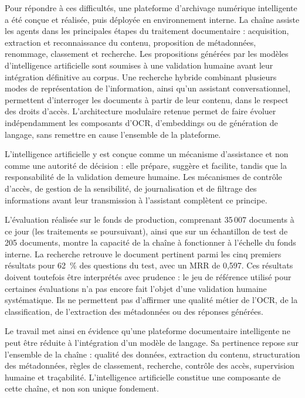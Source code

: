 \documentclass[12pt,a4paper]{report}
\begin{document}
Pour répondre à ces difficultés, une plateforme d'archivage numérique intelligente a été conçue et réalisée, puis déployée en environnement interne. La chaîne assiste les agents dans les principales étapes du traitement documentaire : acquisition, extraction et reconnaissance du contenu, proposition de métadonnées, renommage, classement et recherche. Les propositions générées par les modèles d'intelligence artificielle sont soumises à une validation humaine avant leur intégration définitive au corpus. Une recherche hybride combinant plusieurs modes de représentation de l'information, ainsi qu'un assistant conversationnel, permettent d'interroger les documents à partir de leur contenu, dans le respect des droits d'accès. L'architecture modulaire retenue permet de faire évoluer indépendamment les composants d'OCR, d'embeddings ou de génération de langage, sans remettre en cause l'ensemble de la plateforme.

L'intelligence artificielle y est conçue comme un mécanisme d'assistance et non comme une autorité de décision : elle prépare, suggère et facilite, tandis que la responsabilité de la validation demeure humaine. Les mécanismes de contrôle d'accès, de gestion de la sensibilité, de journalisation et de filtrage des informations avant leur transmission à l'assistant complètent ce principe.

L'évaluation réalisée sur le fonds de production, comprenant 35\,007 documents à ce jour (les traitements se poursuivant), ainsi que sur un échantillon de test de 205 documents, montre la capacité de la chaîne à fonctionner à l'échelle du fonds interne. La recherche retrouve le document pertinent parmi les cinq premiers résultats pour 62~\% des questions du test, avec un MRR de 0,597. Ces résultats doivent toutefois être interprétés avec prudence : le jeu de référence utilisé pour certaines évaluations n'a pas encore fait l'objet d'une validation humaine systématique. Ils ne permettent pas d'affirmer une qualité métier de l'OCR, de la classification, de l'extraction des métadonnées ou des réponses générées.

Le travail met ainsi en évidence qu'une plateforme documentaire intelligente ne peut être réduite à l'intégration d'un modèle de langage. Sa pertinence repose sur l'ensemble de la chaîne : qualité des données, extraction du contenu, structuration des métadonnées, règles de classement, recherche, contrôle des accès, supervision humaine et traçabilité. L'intelligence artificielle constitue une composante de cette chaîne, et non son unique fondement.
\end{document}
